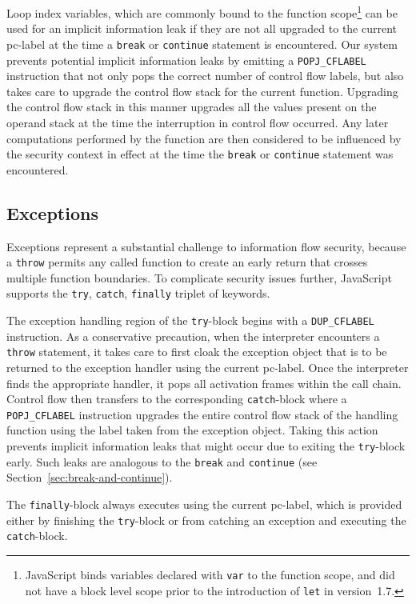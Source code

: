 Loop index variables, which are commonly bound to the function scope\footnote{JavaScript binds variables declared with \texttt{var} to the function scope, and did not have a block level scope prior to the introduction of \texttt{let} in version~1.7.} can be used for an implicit information leak if they are not all upgraded to the current pc-label at the time a \texttt{break} or \texttt{continue} statement is encountered.
Our system prevents potential implicit information leaks by emitting a \texttt{POPJ\_CFLABEL} instruction that not only pops the correct number of control flow labels, but also takes care to upgrade the control flow stack for the current function.
Upgrading the control flow stack in this manner upgrades all the values present on the operand stack at the time the interruption in control flow occurred.
Any later computations performed by the function are then considered to be influenced by the security context in effect at the time the \texttt{break} or \texttt{continue} statement was encountered.

\subsection{Exceptions}
\label{sec:exceptions}
Exceptions represent a substantial challenge to information flow security, because a \texttt{throw} permits any called function to create an early return that crosses multiple function boundaries.
To complicate security issues further, JavaScript supports the \texttt{try}, \texttt{catch}, \texttt{finally} triplet of keywords.

The exception handling region of the \texttt{try}-block begins with a \texttt{DUP\_CFLABEL} instruction.
As a conservative precaution, when the interpreter encounters a \texttt{throw} statement, it takes care to first cloak the exception object that is to be returned to the exception handler using the current pc-label.
Once the interpreter finds the appropriate handler, it pops all activation frames within the call chain.
Control flow then transfers to the corresponding \texttt{catch}-block where a \texttt{POPJ\_CFLABEL} instruction upgrades the entire control flow stack of the handling function using the label taken from the exception object.
Taking this action prevents implicit information leaks that might occur due to exiting the \texttt{try}-block early.
Such leaks are analogous to the \texttt{break} and \texttt{continue} (see Section~\ref{sec:break-and-continue}).

The \texttt{finally}-block always executes using the current pc-label, which is provided either by finishing the \texttt{try}-block or from catching an exception and executing the \texttt{catch}-block.

